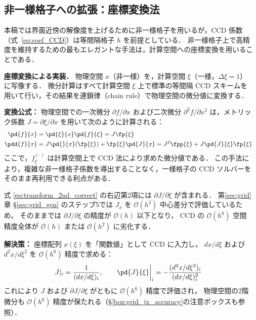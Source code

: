 %
%
\subsection{非一様格子への拡張：座標変換法}
\label{sec:ccd_metric}

本稿では界面近傍の解像度を上げるために非一様格子を用いるが，CCD 係数（式~\eqref{eq:coef_CCD}）は等間隔格子 $h$ を前提としている．
非一様格子上で高精度を維持するための最もエレガントな手法は，計算空間への座標変換を用いることである．

\noindent\textbf{座標変換による実装．}
物理空間 $x$（非一様）を，計算空間 $\xi$（一様，$\Delta\xi=1$）に写像する．
微分計算はすべて計算空間 $\xi$ 上で標準の等間隔 CCD スキームを用いて行い，その結果を連鎖律（chain rule）で物理空間の微分値に変換する．

\textbf{変換公式：}
物理空間での一次微分 $\partial f/\partial x$ および二次微分 $\partial^2 f/\partial x^2$ は，メトリック係数 $J = \partial \xi / \partial x$ を用いて次のように計算される：
\begin{align}
  \pd{f}{x} &= \pd{\xi}{x}\pd{f}{\xi} = J \fp{\xi} \\
  \pdd{f}{x} &= J \pd{}{x}\!\left(\fp{\xi}\right) + \fp{\xi}\pd{J}{x} = J^2 \fpp{\xi} + J \pd{J}{\xi} \fp{\xi}
\end{align}
ここで，$f^{(\cdot)}_\xi$ は計算空間上で CCD 法により求めた微分値である．
この手法により，複雑な非一様格子係数を導出することなく，一様格子の CCD ソルバーをそのまま再利用できる利点がある．

\medskip

\begin{tcolorbox}[warnbox, title={$\partial J/\partial\xi$ の精度：全体精度への影響}]
式 \eqref{eq:transform_2nd_correct} の右辺第2項には $\partial J/\partial\xi$ が含まれる．
第\ref{sec:grid}章 §\ref{sec:grid_gen} のステップ5では $J_x$ を $\mathcal{O}(h^2)$ 中心差分で評価しているため，
そのままでは $\partial J/\partial\xi$ の精度が $\mathcal{O}(h)$ 以下となり，
CCD の $\mathcal{O}(h^6)$ 空間精度全体が $\mathcal{O}(h)$ または $\mathcal{O}(h^2)$ に劣化する．

\textbf{解決策：} 座標配列 $x(\xi)$ を「関数値」として CCD に入力し，
$dx/d\xi$ および $d^2x/d\xi^2$ を $\mathcal{O}(h^6)$ 精度で求める：
\[
  J|_i = \frac{1}{(dx/d\xi)_i}, \qquad
  \pd{J}{\xi}\bigg|_i = -\frac{(d^2x/d\xi^2)_i}{(dx/d\xi)_i^2}
\]
これにより $J$ および $\partial J/\partial\xi$ がともに $\mathcal{O}(h^6)$ 精度で評価され，
物理空間の2階微分も $\mathcal{O}(h^6)$ 精度が保たれる（§\ref{box:grid_jx_accuracy}の注意ボックスも参照）．
\end{tcolorbox}

